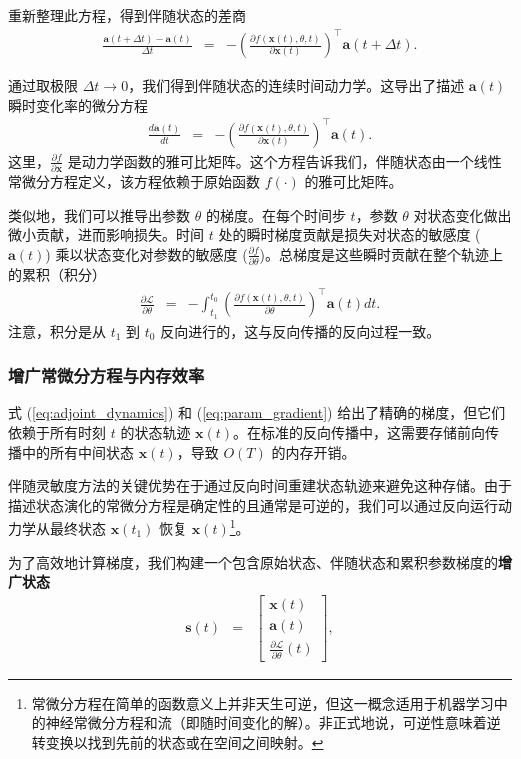 重新整理此方程，得到伴随状态的差商
\begin{eqnarray}
\frac{\mathbf{a}(t+\Delta t) - \mathbf{a}(t)}{\Delta t} & = & - \left( \frac{\partial f(\mathbf{x}(t), \theta, t)}{\partial \mathbf{x}(t)} \right)^\top \mathbf{a}(t+\Delta t).
\end{eqnarray}

通过取极限 $\Delta t \to 0$，我们得到伴随状态的连续时间动力学。这导出了描述 $\mathbf{a}(t)$ 瞬时变化率的微分方程
\begin{eqnarray}
\frac{d \mathbf{a}(t)}{d t} & = & - \left( \frac{\partial f(\mathbf{x}(t), \theta, t)}{\partial \mathbf{x}(t)} \right)^\top \mathbf{a}(t) . \label{eq:adjoint_dynamics}
\end{eqnarray}
这里，$\frac{\partial f}{\partial \mathbf{x}}$ 是动力学函数的雅可比矩阵。这个方程告诉我们，伴随状态由一个线性常微分方程定义，该方程依赖于原始函数 $f(\cdot)$ 的雅可比矩阵。

类似地，我们可以推导出参数 $\theta$ 的梯度。在每个时间步 $t$，参数 $\theta$ 对状态变化做出微小贡献，进而影响损失。时间 $t$ 处的瞬时梯度贡献是损失对状态的敏感度 ($\mathbf{a}(t)$) 乘以状态变化对参数的敏感度 ($\frac{\partial f}{\partial \theta}$)。总梯度是这些瞬时贡献在整个轨迹上的累积（积分）
\begin{eqnarray}
\frac{\partial \mathcal{L}}{\partial \theta} & = & - \int_{t_1}^{t_0} \left( \frac{\partial f(\mathbf{x}(t), \theta, t)}{\partial \theta} \right)^\top \mathbf{a}(t) dt. \label{eq:param_gradient}
\end{eqnarray}
注意，积分是从 $t_1$ 到 $t_0$ 反向进行的，这与反向传播的反向过程一致。
\subsubsection{增广常微分方程与内存效率}

式 (\ref{eq:adjoint_dynamics}) 和 (\ref{eq:param_gradient}) 给出了精确的梯度，但它们依赖于所有时刻 $t$ 的状态轨迹 $\mathbf{x}(t)$。在标准的反向传播中，这需要存储前向传播中的所有中间状态 $\mathbf{x}(t)$，导致 $O(T)$ 的内存开销。

伴随灵敏度方法的关键优势在于通过反向时间重建状态轨迹来避免这种存储。由于描述状态演化的常微分方程是确定性的且通常是可逆的，我们可以通过反向运行动力学从最终状态 $\mathbf{x}(t_1)$ 恢复 $\mathbf{x}(t)$\footnote{常微分方程在简单的函数意义上并非天生可逆，但这一概念适用于机器学习中的神经常微分方程和流（即随时间变化的解）。非正式地说，可逆性意味着逆转变换以找到先前的状态或在空间之间映射。}。

为了高效地计算梯度，我们构建一个包含原始状态、伴随状态和累积参数梯度的\textbf{增广状态}
\begin{eqnarray}
\mathbf{s}(t) & = & \begin{bmatrix} \mathbf{x}(t) \\ \mathbf{a}(t) \\ \frac{\partial \mathcal{L}}{\partial \theta}(t) \end{bmatrix},
\end{eqnarray}

